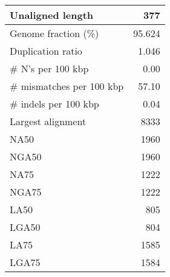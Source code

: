 \documentclass[12pt,a4paper]{article}
\begin{document}
\begin{table}[ht]
\begin{center}
\begin{tabular}{|l*{1}{|r}|}
Unaligned length & 377 \\ \hline
Genome fraction (\%) & 95.624 \\ \hline
Duplication ratio & 1.046 \\ \hline
\# N's per 100 kbp & 0.00 \\ \hline
\# mismatches per 100 kbp & 57.10 \\ \hline
\# indels per 100 kbp & 0.04 \\ \hline
Largest alignment & 8333 \\ \hline
NA50 & 1960 \\ \hline
NGA50 & 1960 \\ \hline
NA75 & 1222 \\ \hline
NGA75 & 1222 \\ \hline
LA50 & 805 \\ \hline
LGA50 & 804 \\ \hline
LA75 & 1585 \\ \hline
LGA75 & 1584 \\ \hline
\end{tabular}
\end{center}
\end{table}
\end{document}
